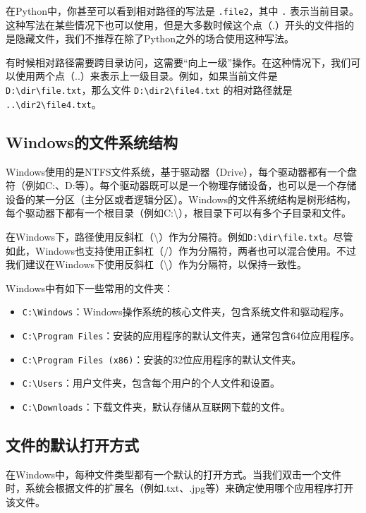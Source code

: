 \documentclass[../main.tex]{subfiles}
\begin{document}
在Python中，你甚至可以看到相对路径的写法是 \texttt{.file2}，其中 \texttt{.} 表示当前目录。这种写法在某些情况下也可以使用，但是大多数时候这个点（.）开头的文件指的是隐藏文件，我们不推荐在除了Python之外的场合使用这种写法。

有时候相对路径需要跨目录访问，这需要“向上一级”操作。在这种情况下，我们可以使用两个点（..）来表示上一级目录。例如，如果当前文件是 \texttt{D:\textbackslash dir\textbackslash file.txt}，那么文件 \texttt{D:\textbackslash dir2\textbackslash file4.txt} 的相对路径就是 \texttt{..\textbackslash dir2\textbackslash file4.txt}。

\subsection{Windows的文件系统结构}

Windows使用的是NTFS文件系统，基于驱动器（Drive），每个驱动器都有一个盘符（例如C:、D:等）。每个驱动器既可以是一个物理存储设备，也可以是一个存储设备的某一分区（主分区或者逻辑分区）。Windows的文件系统结构是树形结构，每个驱动器下都有一个根目录（例如C:\textbackslash），根目录下可以有多个子目录和文件。

在Windows下，路径使用反斜杠（\textbackslash）作为分隔符。例如\texttt{D:\textbackslash dir\textbackslash file.txt}。尽管如此，Windows也支持使用正斜杠（/）作为分隔符，两者也可以混合使用。不过我们建议在Windows下使用反斜杠（\textbackslash）作为分隔符，以保持一致性。

Windows中有如下一些常用的文件夹：
\begin{itemize}
  \item \texttt{C:\textbackslash Windows}：Windows操作系统的核心文件夹，包含系统文件和驱动程序。
  \item \texttt{C:\textbackslash Program Files}：安装的应用程序的默认文件夹，通常包含64位应用程序。
  \item \texttt{C:\textbackslash Program Files (x86)}：安装的32位应用程序的默认文件夹。
  \item \texttt{C:\textbackslash Users}：用户文件夹，包含每个用户的个人文件和设置。
  \item \texttt{C:\textbackslash Downloads}：下载文件夹，默认存储从互联网下载的文件。
\end{itemize}

\subsection{文件的默认打开方式}

在Windows中，每种文件类型都有一个默认的打开方式。当我们双击一个文件时，系统会根据文件的扩展名（例如.txt、.jpg等）来确定使用哪个应用程序打开该文件。
\end{document}
